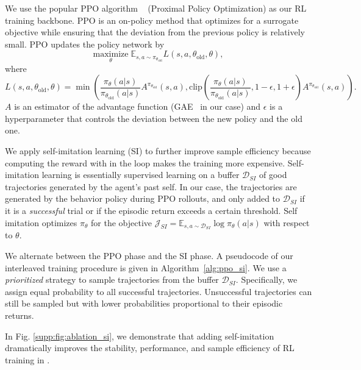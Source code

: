  We use the popular PPO algorithm ~\cite{schulman2017proximal} (Proximal Policy Optimization) as our RL training backbone. PPO is an on-policy method that optimizes for a surrogate objective while ensuring that the deviation from the previous policy is relatively small. PPO updates the policy network by
\begin{equation}
    \underset{\theta}{\text{maximize}}\;\mathbb{E}_{s,a\sim\pi_{\theta_{\text{old}}}} L(s, a, \theta_\text{old}, \theta),
\end{equation} where
\begin{equation}
    L(s, a, \theta_\text{old}, \theta) = \min \left(\frac{\pi_{\theta}(a|s)}{\pi_{\theta_\text{old}}(a|s)} A^{\pi_{\theta_\text{old}}}(s, a), \text{clip}\left(\frac{\pi_{\theta}(a|s)}{\pi_{\theta_\text{old}}(a|s)}, 1-\epsilon, 1+\epsilon\right)A^{\pi_{\theta_\text{old}}}(s, a)\right).
    \label{eq:ppo_objective}
\end{equation}
$A$ is an estimator of the advantage function (GAE~\cite{DBLP:journals/corr/SchulmanMLJA15} in our case) and $\epsilon$ is a hyperparameter that controls the deviation between the new policy and the old one.

 We apply self-imitation learning \cite{oh2018self} (SI) to further improve sample efficiency because computing the reward with \mineclip in the loop makes the training more expensive. Self-imitation learning is essentially supervised learning on a buffer $\mathcal{D}_{SI}$ of good trajectories generated by the agent's past self. In our case, the trajectories are generated by the behavior policy during PPO rollouts, and only added to $\mathcal{D}_{SI}$ if it is a \emph{successful} trial or if the episodic return exceeds a certain threshold. Self imitation optimizes $\pi_\theta$ for the objective  
$\mathcal{J}_{SI} = \mathbb{E}_{s, a \sim \mathcal{D}_{SI}} \log \pi_\theta (a \vert s)$ 
with respect to $\theta$.

We alternate between the PPO phase and the SI phase. 
A pseudocode of our interleaved training procedure is given in Algorithm~\ref{alg:ppo_si}. We use a \emph{prioritized} strategy to sample trajectories from the buffer $\mathcal{D}_{SI}$. Specifically, we assign equal probability to all successful trajectories. Unsuccessful trajectories can still be sampled but with lower probabilities proportional to their episodic returns. 

In Fig. \ref{supp:fig:ablation_si}, we demonstrate that adding self-imitation dramatically improves the stability, performance, and sample efficiency of RL training in \minedojo.  

